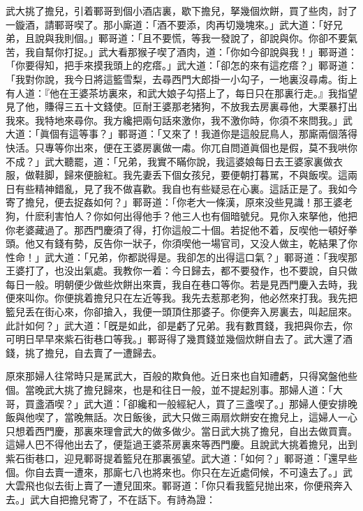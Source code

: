 武大挑了擔兒，引着鄆哥到個小酒店裏，歇下擔兒，拏幾個炊餅，買了些肉，討了一鏇酒，請鄆哥喫了。那小廝道：「酒不要添，肉再切幾塊來。」武大道：「好兄弟，且說與我則個。」鄆哥道：「且不要慌，等我一發說了，卻說與你。你卻不要氣苦，我自幫你打捉。」武大看那猴子喫了酒肉，道：「你如今卻說與我！」鄆哥道：「你要得知，把手來摸我頭上的疙瘩。」武大道：「卻怎的來有這疙瘩？」鄆哥道：「我對你說，我今日將這籃雪梨，去尋西門大郎掛一小勾子，一地裏沒尋䖏。街上有人道：『他在王婆茶坊裏來，和武大娘子勾搭上了，每日只在那裏行走。』我指望見了他，賺得三五十文錢使。叵耐王婆那老猪狗，不放我去房裏尋他，大栗暴打出我來。我特地來尋你。我方纔把兩句話來激你，我不激你時，你須不來問我。」武大道：「眞個有這等事？」鄆哥道：「又來了！我道你是這般屁鳥人，那廝兩個落得快活。只專等你出來，便在王婆房裏做一䖏。你兀自問道眞個也是假，莫不我哄你不成？」武大聽罷，道：「兄弟，我實不瞞你說，我這婆娘每日去王婆家裏做衣服，做鞋脚，歸來便臉紅。我先妻丢下個女孩兒，要便朝打暮駡，不與飯喫。這兩日有些精神錯亂，見了我不做喜歡。我自也有些疑忌在心裏。這話正是了。我如今寄了擔兒，便去捉姦如何？」鄆哥道：「你老大一條漢，原來没些見識！那王婆老狗，什麽利害怕人？你如何出得他手？他三人也有個暗號兒。見你入來拏他，他把你老婆藏過了。那西門慶須了得，打你這般二十個。若捉他不着，反喫他一頓好拳頭。他又有錢有勢，反告你一狀子，你須喫他一場官司，又没人做主，乾結果了你性命！」武大道：「兄弟，你都説得是。我卻怎的出得這口氣？」鄆哥道：「我喫那王婆打了，也没出氣處。我教你一着：今日歸去，都不要發作，也不要說，自只做每日一般。明朝便少做些炊餅出來賣，我自在巷口等你。若是見西門慶入去時，我便來叫你。你便挑着擔兒只在左近等我。我先去惹那老狗，他必然來打我。我先把籃兒丢在街心來，你卻搶入，我便一頭頂住那婆子。你便奔入房裏去，叫起屈來。此計如何？」武大道：「旣是如此，卻是虧了兄弟。我有數貫錢，我把與你去，你可明日早早來紫石街巷口等我。」鄆哥得了幾貫錢並幾個炊餅自去了。武大還了酒錢，挑了擔兒，自去賣了一遭歸去。

原來那婦人往常時只是駡武大，百般的欺負他。近日來也自知禮虧，只得窝盤他些個。當晚武大挑了擔兒歸來，也是和往日一般，並不提起別事。那婦人道：「大哥，買盞酒喫？」武大道：「卻纔和一般經紀人，買了三盞喫了。」那婦人便安排晚飯與他喫了，當晚無話。次日飯後，武大只做三兩扇炊餅安在擔兒上，這婦人一心只想着西門慶，那裏來理會武大的做多做少。當日武大挑了擔兒，自出去做買賣。這婦人巴不得他出去了，便踅過王婆茶房裏來等西門慶。且說武大挑着擔兒，出到紫石街巷口，迎見鄆哥提着籃兒在那裏張望。武大道：「如何？」鄆哥道：「還早些個。你自去賣一遭來，那廝七八也將來也。你只在左近處伺候，不可遠去了。」武大雲飛也似去街上賣了一遭兒囬來。鄆哥道：「你只看我籃兒抛出來，你便飛奔入去。」武大自把擔兒寄了，不在話下。有詩為證：

